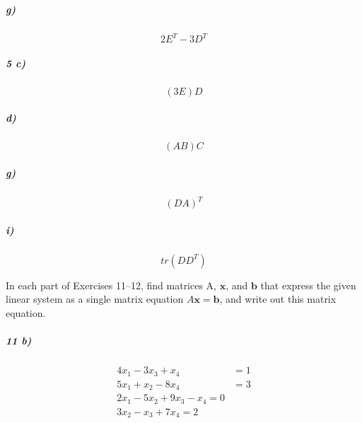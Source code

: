 \documentclass[fleqn]{article}
\begin{document}
\subparagraph{g)}

\[
2E^T-3D^T
\]
\vfill



\subparagraph{5 c)}

\[
(3E)D
\]
\vfill


\pagebreak


\subparagraph{d)}

\[
(AB)C
\]
\vfill



\subparagraph{g)}

\[
(DA)^T
\]
\vfill


\pagebreak


\subparagraph{i)}

\[
tr(DD^T)
\]
\vfill

In each part of Exercises 11–12, find matrices A, $\mathbf{x}$, and $\mathbf{b}$ that express the given linear system as a single matrix equation $A\mathbf{x} = \mathbf{b}$, and write out this matrix equation.

\subparagraph{11 b)}

\[
    \begin{array}{rcl} 4x_1  -3x_3 + x_4 &= 1 \\ 5x_1 + x_2  -8x_4 &= 3 \\ 2x_1 - 5x_2 + 9x_3 - x_4 = 0 \\ 3x_2 - x_3 + 7x_4 = 2\end{array}
\]
\vfill


\pagebreak
\end{document}
